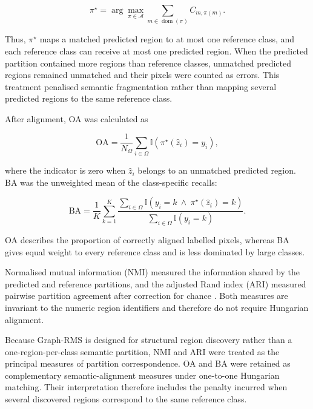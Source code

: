 \documentclass[10pt,a4paper,fleqn]{article}
\begin{document}
\begin{equation}
\pi^{\star}
=
\arg\max_{\pi\in\mathcal{A}}
\sum_{m\in\operatorname{dom}(\pi)}
C_{m,\pi(m)}.
\label{eq:hungarian_mapping}
\end{equation}

Thus, \(\pi^{\star}\) maps a matched predicted region to at most one reference
class, and each reference class can receive at most one predicted region.
When the predicted partition contained more regions than reference classes,
unmatched predicted regions remained unmatched and their pixels were counted
as errors. This treatment penalised semantic fragmentation rather than mapping
several predicted regions to the same reference class.

After alignment, OA was calculated as

\begin{equation}
\mathrm{OA}
=
\frac{1}{N_{\Omega}}
\sum_{i\in\Omega}
\mathbb{I}
\left(
\pi^{\star}(\widehat{z}_i)=y_i
\right),
\label{eq:overall_accuracy}
\end{equation}

where the indicator is zero when \(\widehat{z}_i\) belongs to an unmatched
predicted region. BA was the unweighted mean of the class-specific recalls:

\begin{equation}
\mathrm{BA}
=
\frac{1}{K}
\sum_{k=1}^{K}
\frac{
\displaystyle
\sum_{i\in\Omega}
\mathbb{I}
\left(
y_i=k
\ \land\
\pi^{\star}(\widehat{z}_i)=k
\right)
}{
\displaystyle
\sum_{i\in\Omega}
\mathbb{I}(y_i=k)
}.
\label{eq:balanced_accuracy}
\end{equation}

OA describes the proportion of correctly aligned labelled pixels, whereas BA
gives equal weight to every reference class and is less dominated by large
classes.

Normalised mutual information (NMI) measured the information shared by the
predicted and reference partitions, and the adjusted Rand index (ARI) measured
pairwise partition agreement after correction for chance
\citep{hubert1985,vinh2010}. Both measures are invariant to the numeric region
identifiers and therefore do not require Hungarian alignment.

Because Graph-RMS is designed for structural region discovery rather than a
one-region-per-class semantic partition, NMI and ARI were treated as the
principal measures of partition correspondence. OA and BA were retained as
complementary semantic-alignment measures under one-to-one Hungarian matching.
Their interpretation therefore includes the penalty incurred when several
discovered regions correspond to the same reference class.
\end{document}
